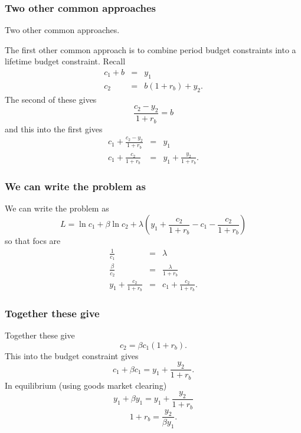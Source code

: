 \documentclass[aspectratio=169]{ltx-talk}
\begin{document}
\begin{frame}
\frametitle{Two other common approaches}
Two other common approaches.

The first other common approach is to combine period budget constraints into
a lifetime budget constraint. Recall 
\begin{eqnarray*}
c_{1}+b &=&y_{1} \\
c_{2} &=&b\left( 1+r_{b}\right) +y_{2}.
\end{eqnarray*}%
The second of these gives 
\begin{equation*}
\frac{c_{2}-y_{2}}{1+r_{b}}=b
\end{equation*}%
and this into the first gives%
\begin{eqnarray*}
c_{1}+\frac{c_{2}-y_{2}}{1+r_{b}} &=&y_{1} \\
c_{1}+\frac{c_{2}}{1+r_{b}} &=&y_{1}+\frac{y_{2}}{1+r_{b}}.
\end{eqnarray*}%
\end{frame}

\begin{frame}
\frametitle{We can write the problem as}
We can write the problem as 
\begin{equation*}
L=\ln c_{1}+\beta \ln c_{2}+\lambda \left( y_{1}+\frac{c_{2}}{1+r_{b}}-c_{1}-%
\frac{c_{2}}{1+r_{b}}\right)
\end{equation*}%
so that focs are%
\begin{eqnarray*}
\frac{1}{c_{1}} &=&\lambda \\
\frac{\beta }{c_{2}} &=&\frac{\lambda }{1+r_{b}} \\
y_{1}+\frac{c_{2}}{1+r_{b}} &=&c_{1}+\frac{c_{2}}{1+r_{b}}.
\end{eqnarray*}%
\end{frame}

\begin{frame}
\frametitle{Together these give}
Together these give 
\begin{equation*}
c_{2}=\beta c_{1}\left( 1+r_{b}\right) .
\end{equation*}%
This into the budget constraint gives%
\begin{equation*}
c_{1}+\beta c_{1}=y_{1}+\frac{y_{2}}{1+r_{b}}.
\end{equation*}%
In equilibrium (using goods market clearing) 
\begin{equation*}
y_{1}+\beta y_{1}=y_{1}+\frac{y_{2}}{1+r_{b}}
\end{equation*}%
\begin{equation*}
1+r_{b}=\frac{y_{2}}{\beta y_{1}}.
\end{equation*}%
\end{frame}
\end{document}
